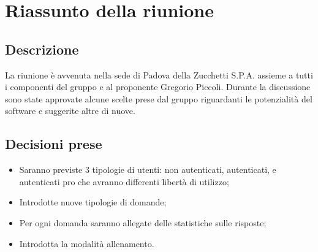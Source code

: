 \section{Riassunto della riunione}
\subsection{Descrizione}
La riunione è avvenuta nella sede di Padova della Zucchetti S.P.A. assieme a tutti i componenti del gruppo e al proponente Gregorio Piccoli. Durante la discussione sono state approvate alcune scelte prese dal gruppo riguardanti le potenzialità del software e suggerite altre di nuove.
\subsection{Decisioni prese}
\begin{itemize}
\item Saranno previste 3 tipologie di utenti: non autenticati, autenticati, e autenticati pro che avranno differenti libertà di utilizzo;
\item Introdotte nuove tipologie di domande;
\item Per ogni domanda saranno allegate delle statistiche sulle risposte;
\item Introdotta la modalità allenamento.
\end{itemize}